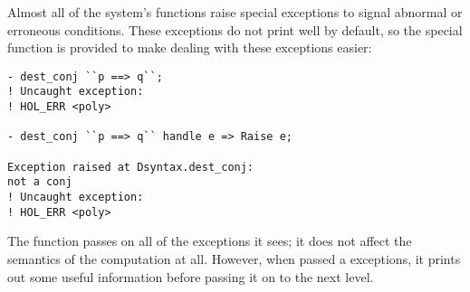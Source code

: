 Almost all of the \HOL{} system's functions raise special
 exceptions to signal abnormal or erroneous conditions.
These exceptions do not print well by default, so the special
 function is provided to make dealing with these exceptions
easier:

\begin{session}\begin{verbatim}
- dest_conj ``p ==> q``;
! Uncaught exception:
! HOL_ERR <poly>

- dest_conj ``p ==> q`` handle e => Raise e;

Exception raised at Dsyntax.dest_conj:
not a conj
! Uncaught exception:
! HOL_ERR <poly>
\end{verbatim}\end{session}

\noindent The  function passes on all of the exceptions it
sees; it does not affect the semantics of the computation at all.
However, when passed a  exceptions, it prints out some
useful information before passing it on to the next level.







